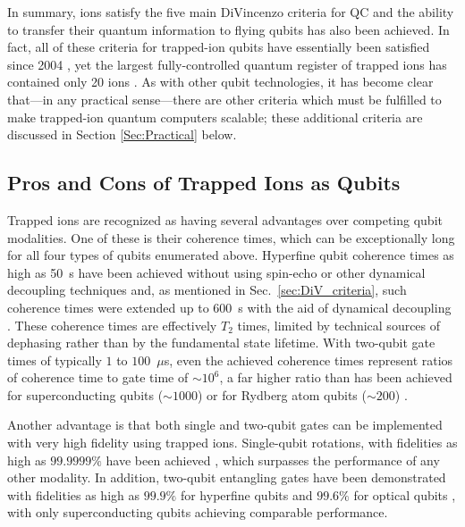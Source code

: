 \documentclass[%
12pt,
 amsmath,amssymb,
]{revtex4-2}
\begin{document}
In summary, ions satisfy the five main DiVincenzo criteria for QC and the ability to transfer their quantum information to flying qubits has also been achieved. In fact, all of these criteria for trapped-ion qubits have essentially been satisfied since 2004 \cite{LeibfriedDidiGate2003,BlinovIonPhotonEntangle2004}, yet the largest fully-controlled quantum register of trapped ions has contained only 20 ions \cite{Friis20QubitEntanglement2018}. As with other qubit technologies, it has become clear that---in any practical sense---there are other criteria which must be fulfilled to make trapped-ion quantum computers scalable; these additional criteria are discussed in Section \ref{Sec:Practical} below.


\subsection{Pros and Cons of Trapped Ions as Qubits}
\label{ProsandCons}

Trapped ions are recognized as having several advantages over competing qubit modalities. One of these is their coherence times, which can be exceptionally long for all four types of qubits enumerated above. Hyperfine qubit coherence times as high as 50~s have been achieved without using spin-echo or other dynamical decoupling techniques \cite{PhysRevLett.113.220501} and, as mentioned in Sec.~\ref{sec:DiV_criteria}, such coherence times were extended up to 600~s with the aid of dynamical decoupling \cite{bollinger_IEEE_550s_ramsey,Wang10MinuteCoherence2017}. These coherence times are effectively $T_2$ times, limited by technical sources of dephasing rather than by the fundamental state lifetime. With two-qubit gate times of typically $1$ to $100$~$\mu$s, even the achieved coherence times represent ratios of coherence time to gate time of ${\sim}10^6$, a far higher ratio than has been achieved for superconducting qubits (${\sim}1000$) \cite{BarendsSCQubitgate2014} or for Rydberg atom qubits (${\sim}200$) \cite{LevineRydbergGate2018}.

Another advantage is that both single and two-qubit gates can be implemented with very high fidelity using trapped ions. Single-qubit rotations, with fidelities as high as $99.9999 \%$ have been achieved \cite{HartyHighFidelityIons2014}, which surpasses the performance of any other modality. In addition, two-qubit entangling gates have been demonstrated with fidelities as high as $99.9 \%$ for hyperfine qubits \cite{Ballance2QubitHyperfineGate2016, nist_gate_2016} and $99.6 \%$ for optical qubits \cite{ErhardBlattCycleBench2019}, with only superconducting qubits achieving comparable performance.
\end{document}
